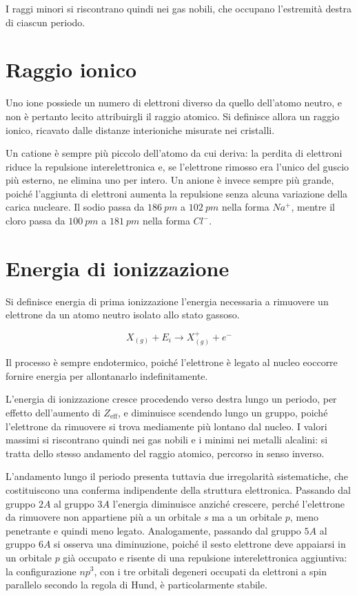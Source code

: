 I raggi minori si riscontrano quindi nei gas nobili, che occupano l'estremità destra di ciascun periodo.

\newpage

\section{Raggio ionico}

Uno ione possiede un numero di elettroni diverso da quello dell'atomo neutro, e non è pertanto lecito attribuirgli il raggio atomico. Si definisce allora un raggio ionico, ricavato dalle distanze interioniche misurate nei cristalli.

Un catione è sempre più piccolo dell'atomo da cui deriva: la perdita di elettroni riduce la repulsione interelettronica e, se l'elettrone rimosso era l'unico del guscio più esterno, ne elimina uno per intero. Un anione è invece sempre più grande, poiché l'aggiunta di elettroni aumenta la repulsione senza alcuna variazione della carica nucleare. Il sodio passa da $186 \ pm$ a $102 \ pm$ nella forma $Na^+$, mentre il cloro passa da $100 \ pm$ a $181 \ pm$ nella forma $Cl^-$.

\section{Energia di ionizzazione}

Si definisce energia di prima ionizzazione l'energia necessaria a rimuovere un elettrone da un atomo neutro isolato allo stato gassoso.

\begin{equation}
    X_{(g)} + E_i \longrightarrow X^+_{(g)} + e^-
    \label{eq:ionizzazione}
\end{equation}

Il processo è sempre endotermico, poiché l'elettrone è legato al nucleo eoccorre fornire energia per allontanarlo indefinitamente.

L'energia di ionizzazione cresce procedendo verso destra lungo un periodo, per effetto dell'aumento di $Z_{\text{eff}}$, e diminuisce scendendo lungo un gruppo, poiché l'elettrone da rimuovere si trova mediamente più lontano dal nucleo. 
I valori massimi si riscontrano quindi nei gas nobili e i minimi nei metalli alcalini: si tratta dello stesso andamento del raggio atomico, percorso in senso inverso.

L'andamento lungo il periodo presenta tuttavia due irregolarità sistematiche, che costituiscono una conferma indipendente della struttura elettronica.
Passando dal gruppo $2A$ al gruppo $3A$ l'energia diminuisce anziché crescere, perché l'elettrone da rimuovere non appartiene più a un orbitale $s$ ma a un orbitale $p$, meno penetrante e quindi meno legato. 
Analogamente, passando dal gruppo $5A$ al gruppo $6A$ si osserva una diminuzione, poiché il sesto elettrone deve appaiarsi in un orbitale $p$ già occupato e risente di una repulsione interelettronica aggiuntiva: la configurazione $np^3$, con i tre orbitali degeneri occupati da elettroni a spin parallelo secondo la regola di Hund, è particolarmente stabile.


